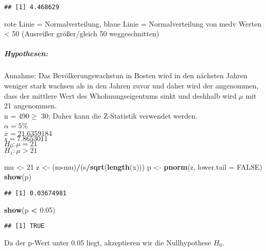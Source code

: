 \documentclass[]{article}
\newenvironment{Shaded}{\begin{snugshade}}{\end{snugshade}}
\newcommand{\KeywordTok}[1]{\textcolor[rgb]{0.13,0.29,0.53}{\textbf{#1}}}
\newcommand{\DataTypeTok}[1]{\textcolor[rgb]{0.13,0.29,0.53}{#1}}
\newcommand{\DecValTok}[1]{\textcolor[rgb]{0.00,0.00,0.81}{#1}}
\newcommand{\FloatTok}[1]{\textcolor[rgb]{0.00,0.00,0.81}{#1}}
\newcommand{\StringTok}[1]{\textcolor[rgb]{0.31,0.60,0.02}{#1}}
\newcommand{\OtherTok}[1]{\textcolor[rgb]{0.56,0.35,0.01}{#1}}
\newcommand{\OperatorTok}[1]{\textcolor[rgb]{0.81,0.36,0.00}{\textbf{#1}}}
\newcommand{\NormalTok}[1]{#1}
\let\oldsubparagraph\subparagraph
\renewcommand{\subparagraph}[1]{\oldsubparagraph{#1}\mbox{}}
\begin{document}
\begin{verbatim}
## [1] 4.468629
\end{verbatim}

rote Linie = Normalverteilung, blaue Linie = Normalverteilung von medv
Werten \textless{} 50 (Ausreißer größer/gleich 50 weggeschnitten)

\subparagraph{Hypothesen:}\label{hypothesen}

Annahme: Das Bevölkerungswachstun in Bosten wird in den nächsten Jahren
weniger stark wachsen als in den Jahren zuvor und daher wird der
angenommen, dass der mittlere Wert des Whohnungseigentums sinkt und
deshhalb wird \(\mu\) mit 21 angenommen.\\
n = \(490 \geq\) 30; Daher kann die Z-Statistik verwendet werden.\\
\(\alpha = 5\)\%\\
\(\overline{x} = 21.6359184\)\\
\(s = 7.8653011\)\\
\(H_0: \mu = 21\)\\
\(H_1: \mu \gt 21\)

\begin{Shaded}
\begin{Highlighting}[]
\NormalTok{mu <-}\StringTok{ }\DecValTok{21}
\NormalTok{z <-}\StringTok{ }\NormalTok{(m}\OperatorTok{-}\NormalTok{mu)}\OperatorTok{/}\NormalTok{(s}\OperatorTok{/}\KeywordTok{sqrt}\NormalTok{(}\KeywordTok{length}\NormalTok{(x)))}
\NormalTok{p <-}\StringTok{ }\KeywordTok{pnorm}\NormalTok{(z, }\DataTypeTok{lower.tail =} \OtherTok{FALSE}\NormalTok{)}
\KeywordTok{show}\NormalTok{(p)}
\end{Highlighting}
\end{Shaded}

\begin{verbatim}
## [1] 0.03674981
\end{verbatim}

\begin{Shaded}
\begin{Highlighting}[]
\KeywordTok{show}\NormalTok{(p }\OperatorTok{<}\StringTok{ }\FloatTok{0.05}\NormalTok{)}
\end{Highlighting}
\end{Shaded}

\begin{verbatim}
## [1] TRUE
\end{verbatim}

Da der p-Wert unter 0.05 liegt, akzeptieren wir die Nullhypothese
\(H_0\).
\end{document}
